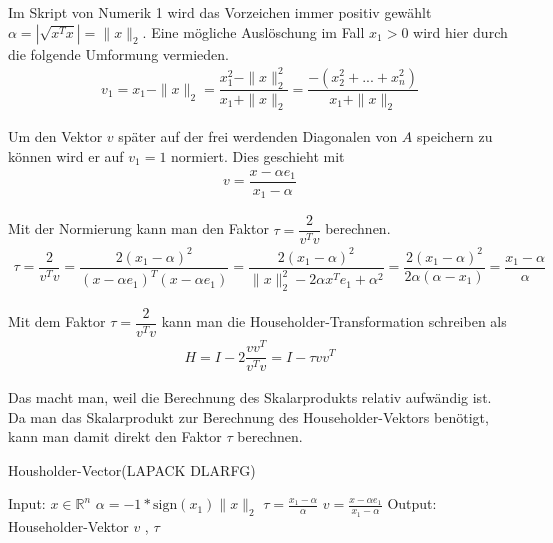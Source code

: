 Im Skript von Numerik 1 \cite{num1} wird das Vorzeichen immer positiv gewählt\\ $\alpha = |\sqrt{x^Tx}| = \|x\|_2$. Eine mögliche Auslöschung im Fall $ x_1 > 0$ wird hier durch die folgende Umformung vermieden.
\begin{align*}
	v_1 = x_1 - \|x\|_2 = \dfrac{x_1^2 - \|x\|_2^2}{x_1 + \|x\|_2}
	=\dfrac{-(x_2^2+...+x_n^2)}{x_1 + \|x\|_2}
\end{align*}



Um den Vektor $v$ später auf der frei werdenden Diagonalen von $A$ speichern zu können wird er auf $v_1 = 1$ normiert. Dies geschieht mit 
\begin{align*}
	v = \dfrac{x - \alpha e_1}{x_1 - \alpha}
\end{align*}

Mit der Normierung kann man den Faktor $\tau = \dfrac{2}{v^Tv}$ berechnen.
\begin{align*}
	\tau = \dfrac{2}{v^Tv} = \dfrac{2 (x_1 - \alpha)^2}{(x - \alpha e_1)^T (x - \alpha e_1)} = \dfrac{2 (x_1 - \alpha)^2}{\|x\|^2_2 - 2\alpha x^Te_1 + \alpha^2} =  \dfrac{2 (x_1 - \alpha)^2}{ 2\alpha (\alpha - x_1)} = \dfrac{x_1 - \alpha}{\alpha}
\end{align*}

Mit dem Faktor $\tau = \dfrac{2}{v^Tv}$ kann man die Householder-Transformation schreiben als
\begin{align*}
	H = I - 2 \dfrac{vv^T}{v^Tv} = I - \tau v v^T
\end{align*}

Das macht man, weil die Berechnung des Skalarprodukts relativ aufwändig ist. Da man das Skalarprodukt zur Berechnung des Householder-Vektors benötigt, kann man damit direkt den Faktor $\tau$ berechnen.


\begin{algorithm}
	\caption{Housholder-Vector(LAPACK DLARFG)}
	\begin{algorithmic}
		\State Input: $x \in \mathbb{R}^n$ 
		\State $\alpha = -1 * \text{sign}(x_1) \|x\|_2$
		\State $\tau = \frac{x_1 - \alpha}{\alpha}$
		\State $v=\frac{x - \alpha e_1}{x_1 - \alpha}$
		\State Output: Householder-Vektor $v$ , $\tau$
	\end{algorithmic} 
	\label{alg:unblockedqr}
\end{algorithm}


